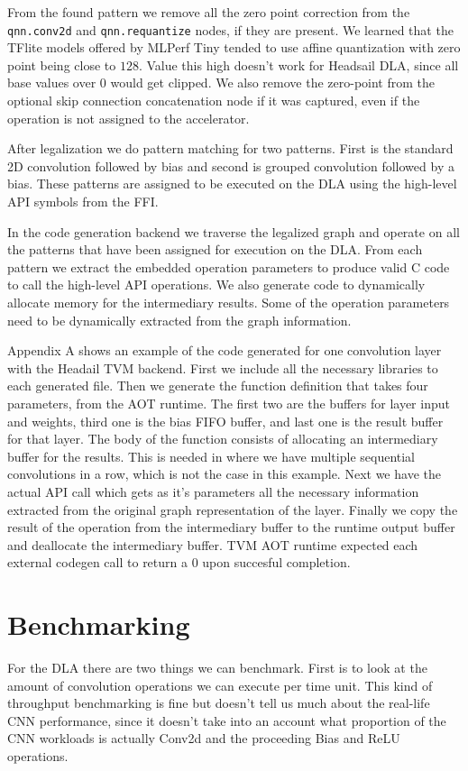 \documentclass[12pt,a4paper,english
]{tunithesis}
\begin{document}
From the found pattern we remove all the zero point correction from the \texttt{qnn.conv2d} and \texttt{qnn.requantize} nodes, if they are present. We learned that the TFlite models offered by MLPerf Tiny tended to use affine quantization with zero point being close to $128$. Value this high doesn't work for Headsail DLA, since all base values over $0$ would get clipped.
We also remove the zero-point from the optional skip connection concatenation node if it was captured, even if the operation is not assigned to the accelerator.

After legalization we do pattern matching for two patterns. First is the standard 2D convolution followed by bias and second is grouped convolution followed by a bias. These patterns are assigned to be executed on the DLA using the high-level API symbols from the FFI.

In the code generation backend we traverse the legalized graph and operate on all the patterns that have been assigned for execution on the DLA.
From each pattern we extract the embedded operation parameters to produce valid C code to call the high-level API operations. We also generate code to dynamically allocate memory for the intermediary results.
Some of the operation parameters need to be dynamically extracted from the graph information.

Appendix A shows an example of the code generated for one convolution layer with the Headail TVM backend. First we include all the necessary libraries to each generated file. Then we generate the function definition that takes four parameters, from the AOT runtime. The first two are the buffers for layer input and weights, third one is the bias FIFO buffer, and last one is the result buffer for that layer.
The body of the function consists of allocating an intermediary buffer for the results. This is needed in where we have multiple sequential convolutions in a row, which is not the case in this example.
Next we have the actual API call which gets as it's parameters all the necessary information extracted from the original graph representation of the layer. Finally we copy the result of the operation from the intermediary buffer to the runtime output buffer and deallocate the intermediary buffer. TVM AOT runtime expected each external codegen call to return a 0 upon succesful completion.

\section{Benchmarking}
For the DLA there are two things we can benchmark. First is to look at the amount of convolution operations we can execute per time unit. This kind of throughput benchmarking is fine but doesn't tell us much about the real-life CNN performance, since it doesn't take into an account what proportion of the CNN workloads is actually Conv2d and the proceeding Bias and ReLU operations.
\end{document}
